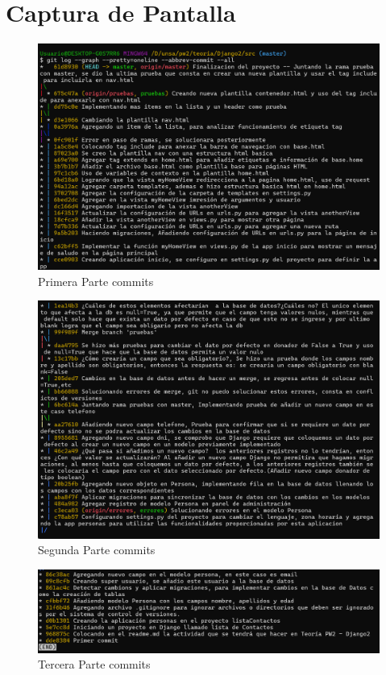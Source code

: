 \documentclass{article}
\begin{document}
	\section{Captura de Pantalla}
  \begin{figure}[H]
    \centering
    \includegraphics[width=1\textwidth, keepaspectratio]{img/commits1.png}
    \caption{Primera Parte commits}
  \end{figure}
  \newpage
  \begin{figure}[H]
    \centering
    \includegraphics[width=1\textwidth, keepaspectratio]{img/commits2.png}
    \caption{Segunda Parte commits}
  \end{figure}
  \begin{figure}[H]
    \centering
    \includegraphics[width=1\textwidth, keepaspectratio]{img/commits3.png}
    \caption{Tercera Parte commits}
  \end{figure}
\end{document}
